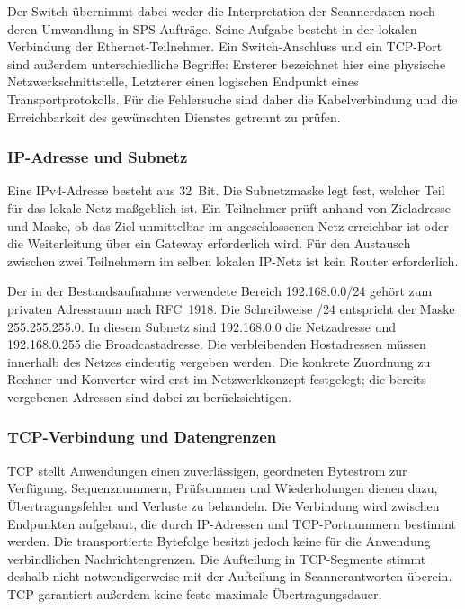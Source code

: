 Der Switch übernimmt dabei weder die Interpretation der Scannerdaten noch deren Umwandlung in SPS-Aufträge. Seine Aufgabe besteht in der lokalen Verbindung der Ethernet-Teilnehmer. Ein Switch-Anschluss und ein TCP-Port sind außerdem unterschiedliche Begriffe: Ersterer bezeichnet hier eine physische Netzwerkschnittstelle, Letzterer einen logischen Endpunkt eines Transportprotokolls. Für die Fehlersuche sind daher die Kabelverbindung und die Erreichbarkeit des gewünschten Dienstes getrennt zu prüfen.

\subsubsection{IP-Adresse und Subnetz}

Eine IPv4-Adresse besteht aus 32~Bit. Die Subnetzmaske legt fest, welcher Teil für das lokale Netz maßgeblich ist. Ein Teilnehmer prüft anhand von Zieladresse und Maske, ob das Ziel unmittelbar im angeschlossenen Netz erreichbar ist oder die Weiterleitung über ein Gateway erforderlich wird. Für den Austausch zwischen zwei Teilnehmern im selben lokalen IP-Netz ist kein Router erforderlich. \cite[Abschn.~3.3.1.1]{rfc1122}

Der in der Bestandsaufnahme verwendete Bereich 192.168.0.0/24 gehört zum privaten Adressraum nach RFC~1918. Die Schreibweise /24 entspricht der Maske 255.255.255.0. In diesem Subnetz sind 192.168.0.0 die Netzadresse und 192.168.0.255 die Broadcastadresse. Die verbleibenden Hostadressen müssen innerhalb des Netzes eindeutig vergeben werden. Die konkrete Zuordnung zu Rechner und Konverter wird erst im Netzwerkkonzept festgelegt; die bereits vergebenen Adressen sind dabei zu berücksichtigen. \cite{rfc1918}

\subsubsection{TCP-Verbindung und Datengrenzen}

TCP stellt Anwendungen einen zuverlässigen, geordneten Bytestrom zur Verfügung. Sequenznummern, Prüfsummen und Wiederholungen dienen dazu, Übertragungsfehler und Verluste zu behandeln. Die Verbindung wird zwischen Endpunkten aufgebaut, die durch IP-Adressen und TCP-Portnummern bestimmt werden. Die transportierte Bytefolge besitzt jedoch keine für die Anwendung verbindlichen Nachrichtengrenzen. Die Aufteilung in TCP-Segmente stimmt deshalb nicht notwendigerweise mit der Aufteilung in Scannerantworten überein. TCP garantiert außerdem keine feste maximale Übertragungsdauer. \cite[Abschn.~2.2 und 3.7]{rfc9293}


